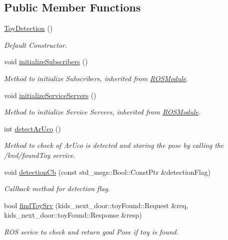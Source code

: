 \subsection*{Public Member Functions}
\begin{DoxyCompactItemize}
\item 
\hyperlink{classToyDetection_ae10edf712502b78e3b49e0421c877ea1}{Toy\+Detection} ()\hypertarget{classToyDetection_ae10edf712502b78e3b49e0421c877ea1}{}\label{classToyDetection_ae10edf712502b78e3b49e0421c877ea1}

\begin{DoxyCompactList}\small\item\em Default Constructor. \end{DoxyCompactList}\item 
void \hyperlink{classToyDetection_a0bc77c348ab5675c6ee59e9d184e483f}{initialize\+Subscribers} ()
\begin{DoxyCompactList}\small\item\em Method to initialize Subscribers, inherited from \hyperlink{classROSModule}{R\+O\+S\+Module}. \end{DoxyCompactList}\item 
void \hyperlink{classToyDetection_a410f48815e4e1727c73d41013fc9a7f3}{initialize\+Service\+Servers} ()
\begin{DoxyCompactList}\small\item\em Method to initialize Service Servers, inherited from \hyperlink{classROSModule}{R\+O\+S\+Module}. \end{DoxyCompactList}\item 
int \hyperlink{classToyDetection_a7198404077e6a5e5a3bb9b438b95b111}{detect\+Ar\+Uco} ()
\begin{DoxyCompactList}\small\item\em Method to check of Ar\+Uco is detected and storing the pose by calling the /knd/found\+Toy service. \end{DoxyCompactList}\item 
void \hyperlink{classToyDetection_a8a59388c998beaa5b2a2d4f4c6f5f63d}{detection\+Cb} (const std\+\_\+msgs\+::\+Bool\+::\+Const\+Ptr \&detection\+Flag)
\begin{DoxyCompactList}\small\item\em Callback method for detection flag. \end{DoxyCompactList}\item 
bool \hyperlink{classToyDetection_a124390e2ea87d3051e403caf738a9168}{find\+Toy\+Srv} (kids\+\_\+next\+\_\+door\+::toy\+Found\+::\+Request \&req, kids\+\_\+next\+\_\+door\+::toy\+Found\+::\+Response \&resp)
\begin{DoxyCompactList}\small\item\em R\+OS serice to check and return goal Pose if toy is found. \end{DoxyCompactList}\end{DoxyCompactItemize}


